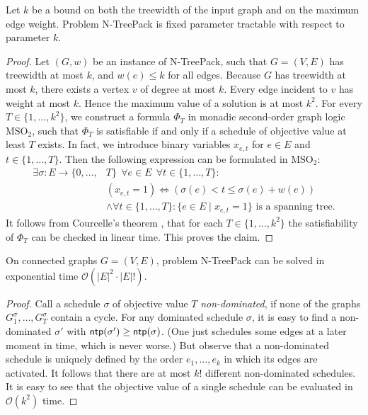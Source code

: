\documentclass[runningheads]{llncs}
\newcommand{\set}[1]{\{ #1 \}}
\newcommand{\bigO}{\mathcal{O}}
\DeclareMathOperator{\ntp}{\text{\sf ntp}}
\newcommand{\xxxNTP}{{\sc N-TreePack}}
\begin{document}
\begin{theorem}
Let $k$ be a bound on both the treewidth of the input graph and on the maximum edge weight.
Problem {\xxxNTP} is fixed parameter tractable with respect to parameter $k$.
\end{theorem}
\begin{proof}
Let $(G, w)$ be an instance of {\xxxNTP}, such that $G = (V, E)$ has treewidth at most $k$, and $w(e) \leq k$ for all edges. Because $G$ has treewidth at most $k$, there exists a vertex $v$ of degree at most $k$. Every edge incident to $v$ has weight at most $k$. Hence the maximum value of a solution is at most $k^2$. For every $T \in \{1,\dots,k^2\}$, we construct a formula $\Phi_T$ in monadic second-order graph logic $\text{MSO}_2$, such that $\Phi_T$ is satisfiable if and only if a schedule of objective value at least $T$ exists. In fact, we introduce binary variables $x_{e,t}$ for $e \in E$ and $t \in \{1,\dots,T\}$. Then the following expression can be formulated in $\text{MSO}_2$:
\begin{align*}
\exists \sigma: E\to\{0,\ldots,&T\} ~~\forall e\in E ~~\forall t\in\{1,\ldots,T\}: \\
& (x_{e,t}=1) \iff \left(\sigma(e) < t \leq \sigma(e) + w(e)\right)\\
& \land \forall t\in\{1,\ldots,T\}: \set{e\in E \mid x_{e,t} = 1} \text{ is a spanning tree.}
\end{align*}
It follows from Courcelle's theorem \cite{courcelle1990monadic}, that for each $T\in\{1,\dots,k^2\}$ the 
satisfiability of $\Phi_T$ can be checked in linear time. This proves the claim.
\end{proof}

\begin{theorem}
\label{th:exact}
On connected graphs $G=(V,E)$, problem {\xxxNTP} can be solved in exponential time $\bigO(|E|^2\cdot|E|!)$.
\end{theorem}
\begin{proof}
Call a schedule $\sigma$ of objective value $T$ \emph{non-dominated}, if none of the graphs 
$G_1^\sigma, \dots, G_T^\sigma$ contain a cycle. 
For any dominated schedule $\sigma$, it is easy to find a non-dominated $\sigma'$ with $\ntp(\sigma')\ge\ntp(\sigma)$. 
(One just schedules some edges at a later moment in time, which is never worse.) 
But observe that a non-dominated schedule is uniquely defined by the order $e_1, \dots, e_k$ 
in which its edges are activated. 
It follows that there are at most $k!$ different non-dominated schedules. 
It is easy to see that the objective value of a single schedule can be evaluated in $\bigO(k^2)$ time. 
\end{proof}
\end{document}
